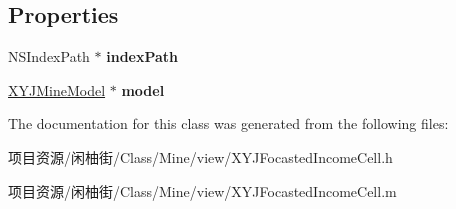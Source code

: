 \subsection*{Properties}
\begin{DoxyCompactItemize}
\item 
\mbox{\label{interface_x_y_j_focasted_income_cell_abd33e882f23b05367be695c1a8c23a9a}} 
N\+S\+Index\+Path $\ast$ {\bfseries index\+Path}
\item 
\mbox{\label{interface_x_y_j_focasted_income_cell_a9f2a3e2b7f1492e9be0eef48a78852d2}} 
\mbox{\hyperlink{interface_x_y_j_mine_model}{X\+Y\+J\+Mine\+Model}} $\ast$ {\bfseries model}
\end{DoxyCompactItemize}


The documentation for this class was generated from the following files\+:\begin{DoxyCompactItemize}
\item 
项目资源/闲柚街/\+Class/\+Mine/view/X\+Y\+J\+Focasted\+Income\+Cell.\+h\item 
项目资源/闲柚街/\+Class/\+Mine/view/X\+Y\+J\+Focasted\+Income\+Cell.\+m\end{DoxyCompactItemize}
